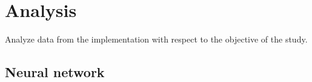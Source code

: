 \chapter{Analysis}
Analyze data from the implementation with respect to the objective of the study.

\section{Neural network}

